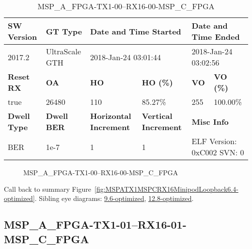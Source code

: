\begin{table}[h]
\centering
\caption{MSP\_A\_FPGA-TX1-00--RX16-00-MSP\_C\_FPGA}
\label{tab:MSPAFPGATX100RX1600MSPCFPGA6.4-optimized}
\begin{tabular}{@{}|l|l|l|l|l|l|@{}}
\toprule
\textbf{SW Version}                & \textbf{GT Type}   & \multicolumn{2}{l|}{\textbf{Date and Time Started}}            & \multicolumn{2}{l|}{\textbf{Date and Time Ended}}        \\ \midrule
2017.2                       & UltraScale GTH          & \multicolumn{2}{l|}{2018-Jan-24 03:01:44}                   & \multicolumn{2}{l|}{2018-Jan-24 03:02:56}               \\ \midrule
\textbf{Reset RX}                  & \textbf{OA} & \textbf{HO}   & \textbf{HO (\%)} & \textbf{VO} & \textbf{VO (\%)} \\ \midrule
true & 26480        & 110          & 85.27\%        & 255        & 100.00\%       \\ \midrule
\textbf{Dwell Type}                & \textbf{Dwell BER} & \textbf{Horizontal Increment} & \textbf{Vertical Increment}    & \multicolumn{2}{l|}{\textbf{Misc Info}}                  \\ \midrule
BER                            & 1e-7        & 1        & 1           & \multicolumn{2}{l|}{ELF Version: 0xC002 SVN: 0}                         \\ \bottomrule
\end{tabular}
\end{table}

\begin{figure}[h]
\caption{MSP\_A\_FPGA-TX1-00--RX16-00-MSP\_C\_FPGA} \label{fig:MSPAFPGATX100RX1600MSPCFPGA6.4-optimized}
\end{figure}

Call back to summary Figure~\ref{fig:MSPATX1MSPCRX16MinipodLoopback6.4-optimized}.
Sibling eye diagrams: \hyperref[sec:MSPAFPGATX100RX1600MSPCFPGA9.6-optimized]{9.6-optimized}, \hyperref[sec:MSPAFPGATX100RX1600MSPCFPGA12.8-optimized]{12.8-optimized}.

\clearpage
\newpage


\subsection{MSP\_A\_FPGA-TX1-01--RX16-01-MSP\_C\_FPGA}\label{sec:MSPAFPGATX101RX1601MSPCFPGA6.4-optimized}

